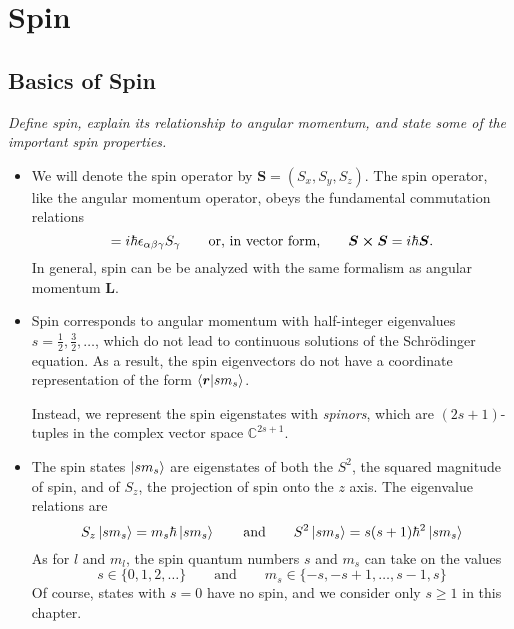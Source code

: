 \documentclass[11pt, a4paper]{article}
\newcommand{\eqtext}[1]{\qquad \text{#1} \qquad}
\newcommand{\Schro}{Schr\"{o}dinger\xspace}
\renewcommand{\vec}[1]{\bm{#1}}  %
\renewcommand{\r}{\vec{r}}  %
\renewcommand{\L}{\vec{L}}  %
\renewcommand{\S}{\vec{S}}  %
\begin{document}
	
\newpage
\section{Spin}


\subsection{Basics of Spin}
\textit{Define spin, explain its relationship to angular momentum, and state some of the important spin properties.}

\begin{itemize}
	\item We will denote the spin operator by $ \S = (S_{x}, S_{y}, S_{z}) $. The spin operator, like the angular momentum operator, obeys the fundamental commutation relations
	\begin{equation*}
		[S_{\alpha}, S_{\beta}] = i \hbar \epsilon_{\alpha \beta \gamma}S_{\gamma} \eqtext{or, in vector form,} \S \cross \S = i \hbar \S.
	\end{equation*}
    In general, spin can be be analyzed with the same formalism as angular momentum $ \L $.
	
    \item Spin corresponds to angular momentum with half-integer eigenvalues $ s = \frac{1}{2}, \frac{3}{2}, \ldots $, which do not lead to continuous solutions of the \Schro equation. As a result, the spin eigenvectors do not have a coordinate representation of the form $ \braket{\r}{sm_{s}} $. 
	
	Instead, we represent the spin eigenstates with \textit{spinors}, which are $ (2s+1) $-tuples in the complex vector space $ \mathbb{C}^{2s + 1} $. 
	
	\item The spin states $ \ket{sm_{s}} $ are eigenstates of both the $ S^{2} $, the squared magnitude of spin, and of $ S_{z} $, the projection of spin onto the $ z $ axis. The eigenvalue relations are
	\begin{equation*}
		S_{z}\ket{sm_{s}} = m_{s}\hbar \ket{sm_{s}} \eqtext{and} S^{2}\ket{sm_{s}} = s(s+1) \hbar^{2} \ket{sm_{s}}
	\end{equation*}
	As for $ l $ and $ m_{l} $, the spin quantum numbers $ s $ and $ m_{s} $ can take on the values
	\begin{equation*}
		s \in \{0, 1, 2, \ldots\} \eqtext{and} m_{s} \in \{-s, -s+1, \ldots, s-1, s\}
	\end{equation*}
	Of course, states with $ s = 0 $ have no spin, and we consider only $ s \geq 1 $ in this chapter.


\end{itemize}
\end{document}
